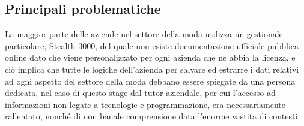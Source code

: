 \subsection{Principali problematiche}
La maggior parte delle aziende nel settore della moda utilizza un gestionale particolare, Stealth 3000, del quale non esiste documentazione ufficiale pubblica online dato che viene personalizzato per ogni azienda che ne abbia la licenza, e ciò implica che tutte le logiche dell'azienda per salvare ed estrarre i dati relativi ad ogni aspetto del settore della moda debbano essere spiegate da una persona dedicata, nel caso di questo stage dal tutor aziendale, per cui l'accesso ad informazioni non legate a tecnologie e programmazione, era necessariamente rallentato, nonché di non banale comprensione data l'enorme vastita di contesti.